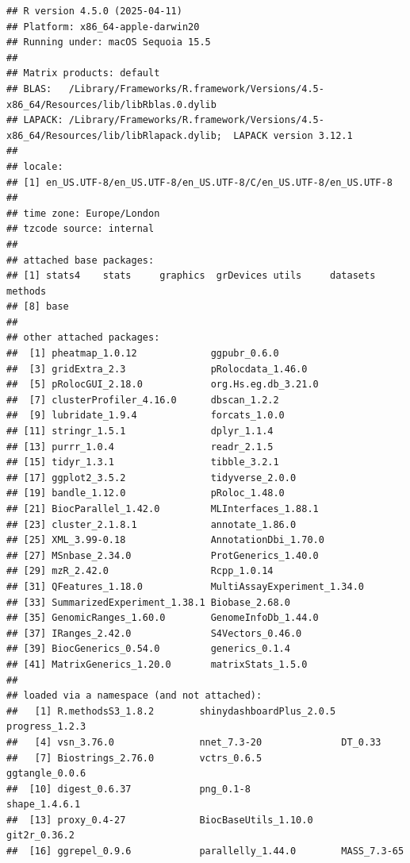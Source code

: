 \documentclass[9pt,a4paper,]{extarticle}
\begin{document}
\begin{verbatim}
## R version 4.5.0 (2025-04-11)
## Platform: x86_64-apple-darwin20
## Running under: macOS Sequoia 15.5
## 
## Matrix products: default
## BLAS:   /Library/Frameworks/R.framework/Versions/4.5-x86_64/Resources/lib/libRblas.0.dylib 
## LAPACK: /Library/Frameworks/R.framework/Versions/4.5-x86_64/Resources/lib/libRlapack.dylib;  LAPACK version 3.12.1
## 
## locale:
## [1] en_US.UTF-8/en_US.UTF-8/en_US.UTF-8/C/en_US.UTF-8/en_US.UTF-8
## 
## time zone: Europe/London
## tzcode source: internal
## 
## attached base packages:
## [1] stats4    stats     graphics  grDevices utils     datasets  methods  
## [8] base     
## 
## other attached packages:
##  [1] pheatmap_1.0.12             ggpubr_0.6.0               
##  [3] gridExtra_2.3               pRolocdata_1.46.0          
##  [5] pRolocGUI_2.18.0            org.Hs.eg.db_3.21.0        
##  [7] clusterProfiler_4.16.0      dbscan_1.2.2               
##  [9] lubridate_1.9.4             forcats_1.0.0              
## [11] stringr_1.5.1               dplyr_1.1.4                
## [13] purrr_1.0.4                 readr_2.1.5                
## [15] tidyr_1.3.1                 tibble_3.2.1               
## [17] ggplot2_3.5.2               tidyverse_2.0.0            
## [19] bandle_1.12.0               pRoloc_1.48.0              
## [21] BiocParallel_1.42.0         MLInterfaces_1.88.1        
## [23] cluster_2.1.8.1             annotate_1.86.0            
## [25] XML_3.99-0.18               AnnotationDbi_1.70.0       
## [27] MSnbase_2.34.0              ProtGenerics_1.40.0        
## [29] mzR_2.42.0                  Rcpp_1.0.14                
## [31] QFeatures_1.18.0            MultiAssayExperiment_1.34.0
## [33] SummarizedExperiment_1.38.1 Biobase_2.68.0             
## [35] GenomicRanges_1.60.0        GenomeInfoDb_1.44.0        
## [37] IRanges_2.42.0              S4Vectors_0.46.0           
## [39] BiocGenerics_0.54.0         generics_0.1.4             
## [41] MatrixGenerics_1.20.0       matrixStats_1.5.0          
## 
## loaded via a namespace (and not attached):
##   [1] R.methodsS3_1.8.2        shinydashboardPlus_2.0.5 progress_1.2.3          
##   [4] vsn_3.76.0               nnet_7.3-20              DT_0.33                 
##   [7] Biostrings_2.76.0        vctrs_0.6.5              ggtangle_0.0.6          
##  [10] digest_0.6.37            png_0.1-8                shape_1.4.6.1           
##  [13] proxy_0.4-27             BiocBaseUtils_1.10.0     git2r_0.36.2            
##  [16] ggrepel_0.9.6            parallelly_1.44.0        MASS_7.3-65             

\end{verbatim}
\end{document}
